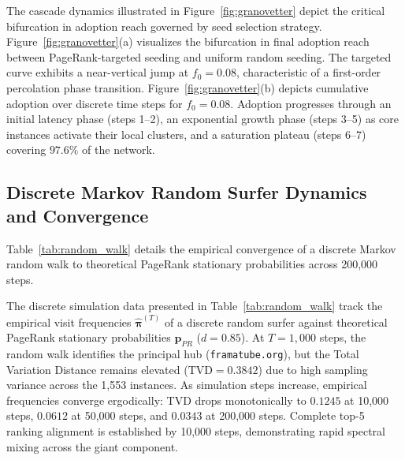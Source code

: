 \documentclass[conference]{IEEEtran}
\begin{document}
The cascade dynamics illustrated in Figure~\ref{fig:granovetter} depict the critical bifurcation in adoption reach governed by seed selection strategy. Figure~\ref{fig:granovetter}(a) visualizes the bifurcation in final adoption reach between PageRank-targeted seeding and uniform random seeding. The targeted curve exhibits a near-vertical jump at $f_0 = 0.08$, characteristic of a first-order percolation phase transition. Figure~\ref{fig:granovetter}(b) depicts cumulative adoption over discrete time steps for $f_0 = 0.08$. Adoption progresses through an initial latency phase (steps 1--2), an exponential growth phase (steps 3--5) as core instances activate their local clusters, and a saturation plateau (steps 6--7) covering $97.6\%$ of the network.

\subsection{Discrete Markov Random Surfer Dynamics and Convergence}

Table~\ref{tab:random_walk} details the empirical convergence of a discrete Markov random walk to theoretical PageRank stationary probabilities across 200,000 steps.

\begin{table}[htbp]
\caption{Discrete Random Walk Convergence and Total Variation Distance to PageRank}
\label{tab:random_walk}
\centering
{}
\end{table}

The discrete simulation data presented in Table~\ref{tab:random_walk} track the empirical visit frequencies $\hat{\boldsymbol{\pi}}^{(T)}$ of a discrete random surfer against theoretical PageRank stationary probabilities $\mathbf{p}_{PR}$ ($d = 0.85$). At $T = 1,000$ steps, the random walk identifies the principal hub (\texttt{framatube.org}), but the Total Variation Distance remains elevated ($\text{TVD} = 0.3842$) due to high sampling variance across the 1,553 instances. As simulation steps increase, empirical frequencies converge ergodically: TVD drops monotonically to $0.1245$ at 10,000 steps, $0.0612$ at 50,000 steps, and $0.0343$ at 200,000 steps. Complete top-5 ranking alignment is established by 10,000 steps, demonstrating rapid spectral mixing across the giant component.
\end{document}
